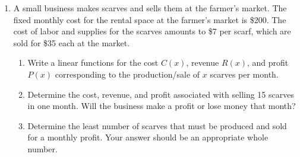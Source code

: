 \documentclass[11pt]{article}
\begin{document}
\begin{enumerate}
\vfill
\vfill



\newpage


\newpage

\item A small business makes scarves and sells them at the farmer's market.  The fixed monthly cost for the rental space at the farmer's market is \$200.  The cost of labor and supplies for the scarves amounts to \$7 per scarf, which are sold for \$35 each at the market.
\begin{enumerate}
\item Write a linear functions for the cost $C(x)$, revenue $R(x)$, and profit $P(x)$ corresponding to the production/sale of $x$ scarves per month.
\vfill
\item Determine the cost, revenue, and profit associated with selling 15 scarves in one month. Will the business make a profit or lose money that month?
\vfill
\item Determine the least number of scarves that must be produced and sold for a monthly profit.  Your answer should be an appropriate whole number.

\end{enumerate}

\vfill


%
%
%
%





\end{enumerate}
\end{document}
